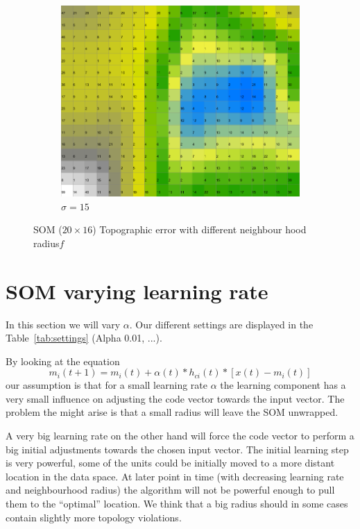 \documentclass{acm_proc_article-sp}
\begin{document}
\begin{figure}
\begin{subfigure}[b]{0.30\linewidth}
        \includegraphics[width=\linewidth]{img/wine-newmid-activity-histogram-sigma-15}
        \caption{$\sigma=15$}
    \end{subfigure}
    \caption{SOM ($20\times16$) Topographic error with different neighbour hood radius$f$}
    \label{fig:wine-newmid-activity-histogram-sigma}
\end{figure}

\section{SOM varying learning rate}

In this section we will vary $\alpha$.  Our different settings are displayed in the Table~\ref{tab:settings} (Alpha 0.01, ...).

By looking at the equation
\[
    m_i(t+1) = m_i(t) + \alpha(t) * h_{ci}(t) * [x(t) - m_i(t)]
\]
our assumption is that for a small learning rate $\alpha$ the learning component has a very small influence on adjusting the code vector towards the input vector.
The problem the might arise is that a small radius will leave the SOM unwrapped.

A very big learning rate on the other hand will force the code vector to perform a big initial adjustments towards the chosen input vector.
The initial learning step is very powerful, some of the units could be initially moved to
a more distant location in the data space. At later point in time (with decreasing learning rate and neighbourhood radius) the algorithm
will not be powerful enough to pull them to the ``optimal'' location. We think that a big radius should in some cases contain slightly more topology violations.
\end{document}
